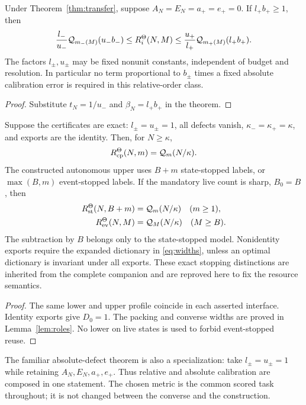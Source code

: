 \begin{corollary}\label{cor:relative}
Under Theorem~\ref{thm:transfer}, suppose $A_N=E_N=a_+=e_+=0$. If $l_+b_+\ge1$, then
\begin{equation}\label{eq:relative}
 \frac{l_-}{u_-}\mathcal Q_{m_-(M)}(u_-b_-)
 \le R_i^\Theta(N,M)
 \le\frac{u_+}{l_+}\mathcal Q_{m_+(M)}(l_+b_+).
\end{equation}
The factors $l_\pm,u_\pm$ may be fixed nonunit constants, independent of budget and resolution. In particular no term proportional to $b_\pm$ times a fixed absolute calibration error is required in this relative-order class.
\end{corollary}
\begin{proof}
Substitute $t_N=1/u_-$ and $\beta_N=l_+b_+$ in the theorem.
\end{proof}

\begin{corollary}\label{cor:exact}
Suppose the certificates are exact: $l_\pm=u_\pm=1$, all defects vanish, $\kappa_-=\kappa_+=\kappa$, and exports are the identity. Then, for $N\ge\kappa$,
\[
 R_{\mathrm{cp}}^\Theta(N,m)=\mathcal Q_m(N/\kappa).
\]
The constructed autonomous upper uses $B+m$ state-stopped labels, or $\max(B,m)$ event-stopped labels. If the mandatory live count is sharp, $B_0=B$, then
\begin{align}
 R_{\mathrm{st}}^\Theta(N,B+m)&=\mathcal Q_m(N/\kappa)\quad(m\ge1),\label{eq:typed-exact}\\
 R_{\mathrm{ev}}^\Theta(N,M)&=\mathcal Q_M(N/\kappa)\quad(M\ge B).\label{eq:event-exact}
\end{align}
The subtraction by $B$ belongs only to the state-stopped model. Nonidentity exports require the expanded dictionary in \eqref{eq:widths}, unless an optimal dictionary is invariant under all exports. These exact stopping distinctions are inherited from the complete companion and are reproved here to fix the resource semantics.
\end{corollary}
\begin{proof}
The same lower and upper profile coincide in each asserted interface. Identity exports give $D_0=1$. The packing and converse widths are proved in Lemma~\ref{lem:roles}. No lower on live states is used to forbid event-stopped reuse.
\end{proof}

The familiar absolute-defect theorem is also a specialization: take $l_\pm=u_\pm=1$ while retaining $A_N,E_N,a_+,e_+$. Thus relative and absolute calibration are composed in one statement. The chosen metric is the common scored task throughout; it is not changed between the converse and the construction.
